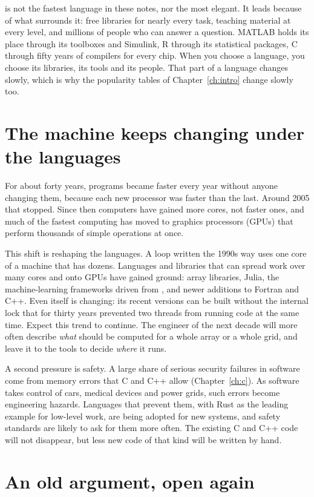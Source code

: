 \py is not the fastest language in these notes, nor the most elegant. It leads because of
what surrounds it: free libraries for nearly every task, teaching material at every
level, and millions of people who can answer a question. MATLAB holds its place through
its toolboxes and Simulink, R through its statistical packages, C through fifty years of
compilers for every chip. When you choose a language, you choose its libraries, its
tools and its people. That part of a language changes slowly, which is why the popularity
tables of Chapter~\ref{ch:intro} change slowly too.

\section*{The machine keeps changing under the languages}

For about forty years, programs became faster every year without anyone changing them,
because each new processor was faster than the last. Around 2005 that stopped. Since then
computers have gained more cores, not faster ones, and much of the fastest computing has
moved to graphics processors (GPUs) that perform thousands of simple operations at once.

This shift is reshaping the languages. A loop written the 1990s way uses one core of a
machine that has dozens. Languages and libraries that can spread work over many cores and
onto GPUs have gained ground: array libraries, Julia, the machine-learning frameworks
driven from \py, and newer additions to Fortran and C++. Even \py itself is changing: its
recent versions can be built without the internal lock that for thirty years prevented
two threads from running \py code at the same time. Expect this trend to continue. The
engineer of the next decade will more often describe \emph{what} should be computed for
a whole array or a whole grid, and leave it to the tools to decide \emph{where} it runs.

A second pressure is safety. A large share of serious security failures in software come
from memory errors that C and C++ allow (Chapter~\ref{ch:c}). As software takes control of
cars, medical devices and power grids, such errors become engineering hazards. Languages
that prevent them, with Rust as the leading example for low-level work, are being
adopted for new systems, and safety standards are likely to ask for them more often. The
existing C and C++ code will not disappear, but less new code of that kind will be
written by hand.

\section*{An old argument, open again}

